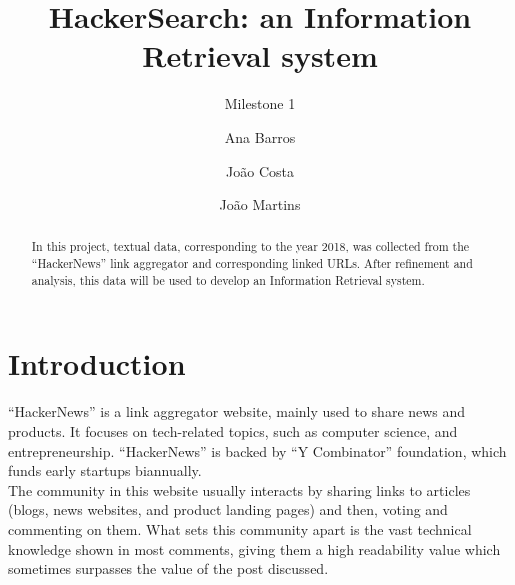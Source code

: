 \documentclass[sigconf]{acmart}
\begin{document}
\title{HackerSearch: an Information Retrieval system}
\subtitle{Milestone 1}

\author{Ana Barros}

\author{João Costa}

\author{João Martins}


\begin{abstract}
    In this project, textual data, corresponding to the year 2018, was
    collected from the ``HackerNews'' link aggregator and corresponding
    linked URLs. After refinement and analysis, this data will be used
    to develop an Information Retrieval system.
\end{abstract}


\maketitle


\section{Introduction}
\label{sec:introduction}
``HackerNews'' is a link aggregator website, mainly used to share news
and products. It focuses on tech-related topics, such as computer science,
and entrepreneurship. ``HackerNews'' is backed by ``Y Combinator''
foundation, which funds early startups biannually.\\
The community in this website usually interacts by sharing links to
articles (blogs, news websites, and product landing pages) and then,
voting and commenting on them. What sets this community apart is the
vast technical knowledge shown in most comments, giving them a high
readability value which sometimes surpasses the value of the post
discussed.
\end{document}
